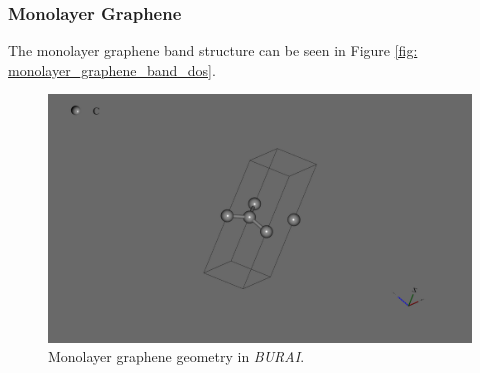 \documentclass[]{article}
\begin{document}
\subsubsection{Monolayer Graphene}

The monolayer graphene band structure can be seen in Figure \ref{fig: monolayer_graphene_band_dos}.

\begin{figure}[H]
	\centering
	\includegraphics[width = \textwidth]{monolayer_graphene_geometry.PNG}
	\caption{Monolayer graphene geometry in \textit{BURAI}.}
	\label{fig: monolayer_graphene_geometry}
\end{figure}
\end{document}
